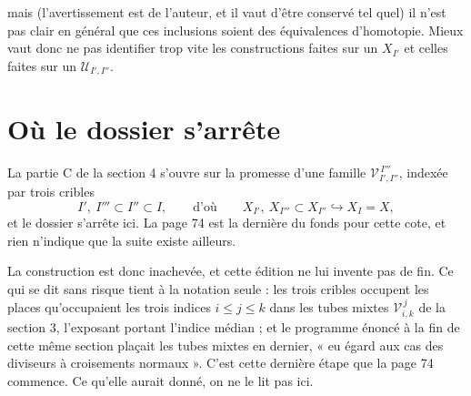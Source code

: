 \documentclass[11pt,a4paper]{article}
\begin{document}

mais (l'avertissement est de l'auteur, et il vaut d'être conservé tel quel)
il n'est pas clair en général que ces inclusions soient des équivalences
d'homotopie. Mieux vaut donc ne pas identifier trop vite les constructions faites
sur un $X_{I'}$ et celles faites sur un $\mathcal{U}_{I',I''}$.

\section*{Où le dossier s'arrête}

La partie C de la section 4 s'ouvre sur la promesse d'une famille
$\mathcal{V}^{\,I'''}_{I',I''}$, indexée par trois cribles
\[
  I',\ I''' \subset I'' \subset I,
  \qquad\text{d'où}\qquad
  X_{I'},\ X_{I'''} \subset X_{I''} \hookrightarrow X_{I} = X,
\]
et le dossier s'arrête ici. La page 74 est la dernière du fonds pour cette cote,
et rien n'indique que la suite existe ailleurs.

La construction est donc inachevée, et cette édition ne lui invente pas de fin.
Ce qui se dit sans risque tient à la notation seule : les trois cribles occupent
les places qu'occupaient les trois indices $i \leq j \leq k$ dans les tubes
mixtes $\mathcal{V}^{\,j}_{i,k}$ de la section 3, l'exposant portant l'indice
médian ; et le programme énoncé à la fin de cette même section plaçait les tubes
mixtes en dernier, « eu égard aux cas des diviseurs à croisements normaux ».
C'est cette dernière étape que la page 74 commence. Ce qu'elle aurait donné, on
ne le lit pas ici.
\end{document}
